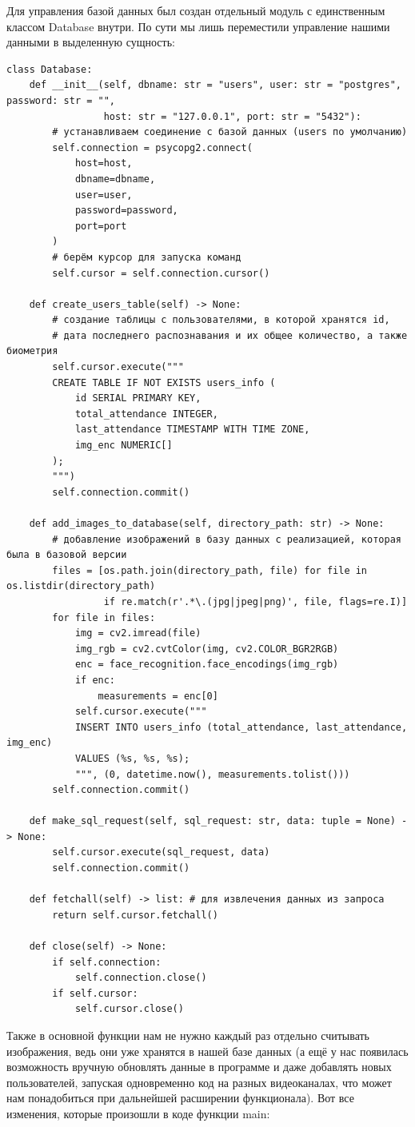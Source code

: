 \documentclass[a4paper,hidelinks,14pt]{extarticle}
\begin{document}
	Для управления базой данных был создан отдельный модуль с единственным классом Database внутри. По сути мы лишь переместили управление нашими данными в выделенную сущность:
	\begin{verbatim}
class Database:
	def __init__(self, dbname: str = "users", user: str = "postgres", password: str = "",
				 host: str = "127.0.0.1", port: str = "5432"):
		# устанавливаем соединение с базой данных (users по умолчанию)
		self.connection = psycopg2.connect(
			host=host,
			dbname=dbname,
			user=user,
			password=password,
			port=port
		)
		# берём курсор для запуска команд
		self.cursor = self.connection.cursor()

	def create_users_table(self) -> None:
		# создание таблицы с пользователями, в которой хранятся id, 
		# дата последнего распознавания и их общее количество, а также биометрия
		self.cursor.execute("""
		CREATE TABLE IF NOT EXISTS users_info (
			id SERIAL PRIMARY KEY,
			total_attendance INTEGER,
			last_attendance TIMESTAMP WITH TIME ZONE,
			img_enc NUMERIC[]
		);
		""")
		self.connection.commit()

	def add_images_to_database(self, directory_path: str) -> None:
		# добавление изображений в базу данных с реализацией, которая была в базовой версии
		files = [os.path.join(directory_path, file) for file in os.listdir(directory_path)
				 if re.match(r'.*\.(jpg|jpeg|png)', file, flags=re.I)]
		for file in files:
			img = cv2.imread(file)
			img_rgb = cv2.cvtColor(img, cv2.COLOR_BGR2RGB)
			enc = face_recognition.face_encodings(img_rgb)
			if enc:
				measurements = enc[0]
			self.cursor.execute("""
			INSERT INTO users_info (total_attendance, last_attendance, img_enc)
			VALUES (%s, %s, %s);
			""", (0, datetime.now(), measurements.tolist()))
		self.connection.commit()

	def make_sql_request(self, sql_request: str, data: tuple = None) -> None:
		self.cursor.execute(sql_request, data)
		self.connection.commit()

	def fetchall(self) -> list: # для извлечения данных из запроса
		return self.cursor.fetchall()

	def close(self) -> None:
		if self.connection:
			self.connection.close()
		if self.cursor:
			self.cursor.close()

	\end{verbatim}
	
	Также в основной функции нам не нужно каждый раз отдельно считывать изображения, ведь они уже хранятся в нашей базе данных (а ещё у нас появилась возможность вручную обновлять данные в программе и даже добавлять новых пользователей, запуская одновременно код на разных видеоканалах, что может нам понадобиться при дальнейшей расширении функционала). Вот все изменения, которые произошли в коде функции main:
	
\end{document}
